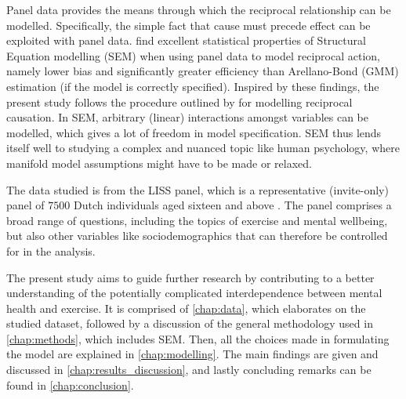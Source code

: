 Panel data provides the means through which the reciprocal relationship can be modelled. Specifically, the simple fact
that cause must precede effect can be exploited with panel data.
 find excellent statistical properties of Structural Equation modelling (SEM)
when using panel data to model reciprocal action, namely lower bias and significantly greater efficiency than Arellano-Bond
(GMM) estimation (if the model is correctly specified).
Inspired by these findings, the present study follows the procedure outlined by 
for modelling reciprocal causation.
In SEM, arbitrary (linear) interactions amongst variables can be modelled, which gives a lot of freedom in model
specification. SEM thus lends itself well to studying a complex and nuanced topic like human psychology,
where manifold model assumptions might have to be made or relaxed.

The data studied is from the LISS panel, which is a representative (invite-only) panel of $7500$ Dutch individuals aged
sixteen and above \cite{scherpenzeel2010liss}. The panel comprises a broad range of questions, including the topics of exercise
and mental wellbeing, but also other variables like sociodemographics that can therefore be controlled for in the analysis.

The present study aims to guide further research by contributing to a better understanding of the potentially
complicated interdependence between mental health and exercise.
It is comprised of \cref{chap:data}, which elaborates on the studied dataset, followed by a discussion of the
general methodology used in \cref{chap:methods}, which includes SEM.
Then, all the choices made in formulating the model are explained in \cref{chap:modelling}.
The main findings are given and discussed in \cref{chap:results_discussion},
and lastly concluding remarks can be found in \cref{chap:conclusion}.
